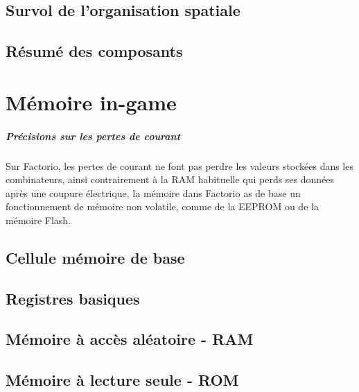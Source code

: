 \documentclass{scrreprt}
\begin{document}
    	\section{Survol de l'organisation spatiale}
    	
    	\section{Résumé des composants}
    	
    	
    	
    
    \chapter{Mémoire in-game}
	    
	    \paragraph{Précisions sur les pertes de courant}
	    Sur Factorio, les pertes de courant ne font pas perdre les valeurs stockées dans les combinateurs, ainsi contrairement à la RAM habituelle qui perds ses données après une coupure électrique, la mémoire dans Factorio as de base un fonctionnement de mémoire non volatile, comme de la EEPROM ou de la mémoire Flash.
	    
	    \section{Cellule mémoire de base}
	    
	    \section{Registres basiques}
	    
	    \section{Mémoire à accès aléatoire - RAM}
	    
	    \section{Mémoire à lecture seule - ROM}
    
\end{document}
